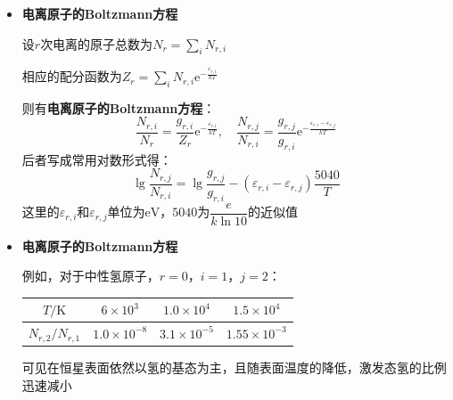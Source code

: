 \documentclass{beamer}
\renewcommand\epsilon{\varepsilon}
\newenvironment{slide}{
    \begin{frame}{\bfseries{\sectiontitle}}
}{
    \end{frame}
}
\begin{document}
\begin{slide}
    \begin{itemize}
        \item \textbf{电离原子的Boltzmann方程}

        设$r$次电离的原子总数为$N_r=\sum\limits_i N_{r,i}$

        相应的配分函数为$Z_r=\sum\limits_i N_{r,i}\mathrm{e}^{-\tfrac{\epsilon_{r,i}}{kT}}$

        则有\textbf{电离原子的Boltzmann方程}：
        \[
            \boxed{
            \frac{N_{r,i}}{N_r} = \frac{g_{r,i}}{Z_r}\mathrm{e}^{-\tfrac{\epsilon_{r,i}}{kT}},\quad
            \frac{N_{r,j}}{N_{r,i}} = \frac{g_{r,j}}{g_{r,i}}\mathrm{e}^{-\tfrac{\epsilon_{r,i}-\epsilon_{r,j}}{kT}}
            }
        \]
        后者写成常用对数形式得：
        \[
            \lg\frac{N_{r,j}}{N_{r,i}} = \lg\frac{g_{r,j}}{g_{r,i}} - (\epsilon_{r,i}-\epsilon_{r,j})\frac{5040}{T}
        \]
        这里的$\epsilon_{r,i}$和$\epsilon_{r,j}$单位为$\mathrm{eV}$，$5040$为$\dfrac{e}{k\ln10}$的近似值
    \end{itemize}
\end{slide}

\begin{slide}
    \begin{itemize}
        \item \textbf{电离原子的Boltzmann方程}

        例如，对于中性氢原子，$r=0$，$i=1$，$j=2$：
        \begin{center}
            \begin{tabular}{|c|c|c|c|}
                \hline
                $T/\mathrm{K}$ & $6\times10^{3}$ & $1.0\times10^{4}$ & $1.5\times10^{4}$ \\
                \hline
                $N_{r,2}/N_{r,1}$ & $1.0\times10^{-8}$ & $3.1\times10^{-5}$ & $1.55\times10^{-3}$ \\
                \hline
            \end{tabular}
        \end{center}
        可见在恒星表面依然以氢的基态为主，且随表面温度的降低，激发态氢的比例迅速减小
    \end{itemize}
\end{slide}
\end{document}
